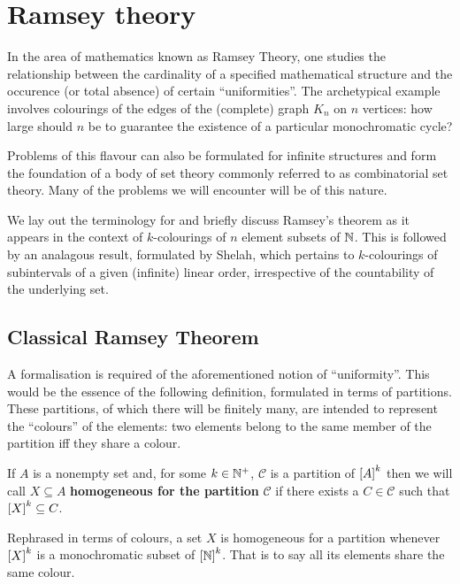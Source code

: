 

\chapter{Ramsey theory}

In the area of mathematics known as Ramsey Theory, one studies the relationship
between the cardinality of a specified mathematical structure and the occurence
(or total absence) of certain ``uniformities''.  The archetypical example
involves colourings of the edges of the (complete) graph $K_n$ on $n$ vertices:
how large should $n$ be to guarantee the existence of a particular monochromatic
cycle?

Problems of this flavour can also be formulated for infinite structures and form
the foundation of a body of set theory commonly referred to as combinatorial
set theory.  Many of the problems we will encounter will be of this nature.

We lay out the terminology for and briefly discuss Ramsey's theorem as it
appears in the context of $k$-colourings of $n$ element subsets of $\nats$.
This is followed by an analagous result, formulated by Shelah, which pertains to
$k$-colourings of subintervals of a given (infinite) linear order, irrespective
of the countability of the underlying set.

\section{Classical Ramsey Theorem}

A formalisation is required of the aforementioned notion of ``uniformity''.
This would be the essence of the following definition, formulated in terms of
partitions.  These partitions, of which there will be finitely many, are
intended to represent the ``colours'' of the elements: two elements belong to
the same member of the partition iff they share a colour.

\begin{dfn}
   If $A$ is a nonempty set and, for some $k\in\posnats$, $\mathcal{C}$ is a
   partition of $\subsets{k}{A}$ then we will call $X\subseteq A$
   \textbf{homogeneous for the partition} $\mathcal{C}$ if there exists a $C\in
   \mathcal{C}$ such that $\subsets{k}{X}\subseteq C$.
\end{dfn}

Rephrased in terms of colours, a set $X$ is homogeneous for a partition whenever
$\subsets{k}{X}$ is a monochromatic subset of $\subsets{k}{\nats}$.  That is to
say all its elements share the same colour.

